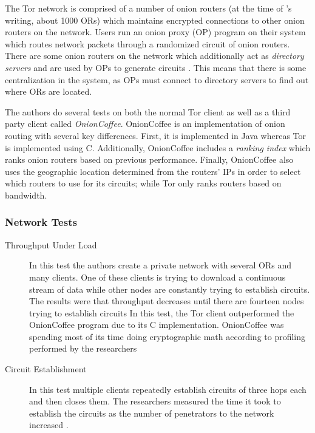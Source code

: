 \documentclass[notitlepage,12pt]{article}
\begin{document}
The Tor network is comprised of a number of onion routers (at the time of
\cite{tor}'s writing, about 1000 ORs) which maintains encrypted connections to
other onion routers on the network. Users run an onion proxy (OP) program on their system
which routes network packets through a randomized circuit of onion
routers. There are some onion routers on the network which additionally act as
\emph{directory servers} and are used by OPs to generate circuits
\cite[p. 2]{tor}. This means that there is some centralization in the system, as
OPs must connect to directory servers to find out where ORs are located.

The authors do several tests on both the normal Tor client as well as a third
party client called \emph{OnionCoffee}. OnionCoffee is an implementation of
onion routing with several key differences. First, it is implemented in Java whereas
Tor is implemented using C. Additionally, OnionCoffee includes a \emph{ranking
  index} which ranks onion routers based on previous performance. Finally,
OnionCoffee also uses the geographic location determined from the routers' IPs
in order to select which routers to use for its circuits; while Tor only ranks
routers based on bandwidth\cite[p.3]{tor}.

\subsubsection{Network Tests}

\label{sec:tor_tests}
\begin{description}
\item[Throughput Under Load] In this test the authors create a private network
  with several ORs and many clients. One of these clients is trying to download
  a continuous stream of data while other nodes are constantly trying to
  establish circuits. The results were that throughput decreases until there are
  fourteen nodes trying to establish circuits \cite[p. 4]{tor} In this test, the
  Tor client outperformed the OnionCoffee program due to its C
  implementation. OnionCoffee was spending most of its time doing cryptographic
  math according to profiling performed by the researchers \cite[p. 4]{tor} 
\item[Circuit Establishment] In this test multiple clients repeatedly establish
  circuits of three hops each and then closes them. The researchers measured the
  time it took to establish the circuits as the number of penetrators to the
  network increased \cite[p. 4]{tor}. 
\end{description}
\end{document}
